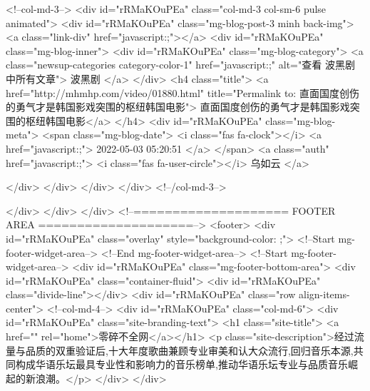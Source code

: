                         <!--col-md-3-->
                        <div id="rRMaKOuPEa"  class="col-md-3 col-sm-6 pulse animated">
                            <div id="rRMaKOuPEa"  class="mg-blog-post-3 minh back-img">
                                <a class="link-div" href="javascript:;"></a>
                                <div id="rRMaKOuPEa"  class="mg-blog-inner">
                                    <div id="rRMaKOuPEa"  class="mg-blog-category">
                                        <a class="newsup-categories category-color-1" href="javascript:;" alt="查看 波黑剧 中所有文章">
                                            波黑剧
                                        </a>
                                    </div>
                                    <h4 class="title"> <a href="http://mhmhp.com/video/01880.html" title="Permalink to: 直面国度创伤的勇气才是韩国影戏突围的枢纽韩国电影"> 直面国度创伤的勇气才是韩国影戏突围的枢纽韩国电影</a> </h4>
                                    <div id="rRMaKOuPEa"  class="mg-blog-meta">
                                        <span class="mg-blog-date">
                                            <i class="fas fa-clock"></i>
                                            <a href="javascript:;">
                                                2022-05-03 05:20:51
                                            </a>
                                        </span>
                                        <a class="auth" href="javascript:;">
                                            <i class="fas fa-user-circle"></i>
                                            乌如云
                                        </a>

                                    </div>
                                </div>
                            </div>
                        </div>
                        <!--/col-md-3-->
                        

                    </div>
                </div>
            </div>
            <!--==================== FOOTER AREA ====================-->
            <footer>
    <div id="rRMaKOuPEa"  class="overlay" style="background-color: ;">
        <!--Start mg-footer-widget-area-->
        <!--End mg-footer-widget-area-->
        <!--Start mg-footer-widget-area-->
        <div id="rRMaKOuPEa"  class="mg-footer-bottom-area">
            <div id="rRMaKOuPEa"  class="container-fluid">
                <div id="rRMaKOuPEa"  class="divide-line"></div>
                <div id="rRMaKOuPEa"  class="row align-items-center">
                    <!--col-md-4-->
                    <div id="rRMaKOuPEa"  class="col-md-6">
                        <div id="rRMaKOuPEa"  class="site-branding-text">
                            <h1 class="site-title"> <a href="" rel="home">零碎不全网</a></h1>
                            <p class="site-description">经过流量与品质的双重验证后,十大年度歌曲兼顾专业审美和认大众流行,回归音乐本源,共同构成华语乐坛最具专业性和影响力的音乐榜单,推动华语乐坛专业与品质音乐崛起的新浪潮。</p>
                        </div>
                    </div>


